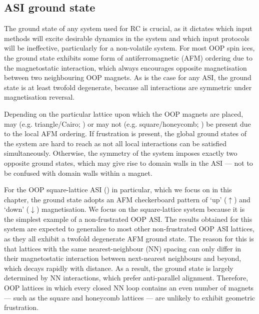 \subsection{ASI ground state}
The ground state of any system used for RC is crucial, as it dictates which input methods will excite desirable dynamics in the system and which input protocols will be ineffective, particularly for a non-volatile system.
For most OOP spin ices, the ground state exhibits some form of antiferromagnetic (AFM) ordering due to the magnetostatic interaction, which always encourages opposite magnetisation between two neighbouring OOP magnets.
As is the case for any ASI, the ground state is at least twofold degenerate, because all interactions are symmetric under magnetisation reversal. \par
Depending on the particular lattice upon which the OOP magnets are placed,  may (e.g. triangle/Cairo; ) or may not (e.g. square/honeycomb; ) be present due to the local AFM ordering.
If frustration is present, the global ground states of the system are hard to reach as not all local interactions can be satisfied simultaneously.
Otherwise, the symmetry of the system imposes exactly two opposite ground states, which may give rise to domain walls in the ASI --- not to be confused with domain walls within a magnet. \par %
For the OOP square-lattice ASI () in particular, which we focus on in this chapter, the ground state adopts an AFM checkerboard pattern of `up' ($\uparrow$) and `down' ($\downarrow$) magnetisation.
We focus on the square-lattice system because it is the simplest example of a non-frustrated OOP ASI.
The results obtained for this system are expected to generalise to most other non-frustrated OOP ASI lattices, as they all exhibit a twofold degenerate AFM ground state.
The reason for this is that lattices with the same nearest-neighbour (NN) spacing can only differ in their magnetostatic interaction between next-nearest neighbours and beyond, which decays rapidly with distance.
As a result, the ground state is largely determined by NN interactions, which prefer anti-parallel alignment.
Therefore, OOP lattices in which every closed NN loop contains an even number of magnets --- such as the square and honeycomb lattices --- are unlikely to exhibit geometric frustration.

